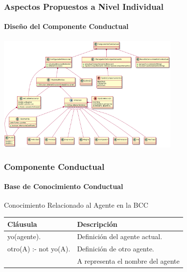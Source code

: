 \documentclass{beamer}
\begin{document}
\begin{frame}
\frametitle{Aspectos Propuestos a Nivel Individual}
\framesubtitle{Diseño del Componente Conductual}
\centering
\includegraphics[width=9cm]{ilustraciones/diseno-componente-conductual}
\end{frame}

\begin{frame}
\frametitle{Componente Conductual}
\framesubtitle{Base de Conocimiento Conductual}
\centering
Conocimiento Relacionado al Agente en la BCC
\begin{table}[!ht]
\centering
\tiny
\begin{tabular}{ll}
\hline
\scriptsize \bfseries Cláusula & \scriptsize \bfseries Descripción \\
\hline
\hline
yo(agente). & Definición del agente actual. \\\hline
otro(A) :- not yo(A). & Definición de otro agente. \\ & A representa el nombre del agente \\
\hline
\end{tabular}
\end{table}
\end{frame}
\end{document}
